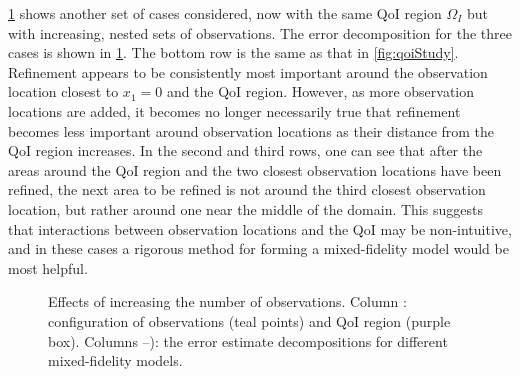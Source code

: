 \cref{fig:dataStudy} shows another set of cases considered, now with the same QoI region $\Omega_I$ but with increasing, nested sets of observations.
The error decomposition for the three cases is shown in \cref{fig:dataStudy}. The bottom row is the same as that in \cref{fig:qoiStudy}. Refinement appears to be consistently most important around the observation location closest to $x_1=0$ and the QoI region. However, as more observation locations are added, it becomes no longer necessarily true that refinement becomes less important around observation locations as their distance from the QoI region increases. In the second and third rows, one can see that after the areas around the QoI region and the two closest observation locations have been refined, the next area to be refined is not around the third closest observation location, but rather around one near the middle of the domain. This suggests that interactions between observation locations and the QoI may be non-intuitive, and in these cases a rigorous method for forming a mixed-fidelity model would be most helpful. %

\begin{figure}[htbp]
\centering
{}
  \caption{Effects of increasing the number of observations. Column \protect{}: configuration of observations (teal points) and QoI region (purple box). Columns \protect{}--\protect{}): the error estimate decompositions for different mixed-fidelity models.}
  \label{fig:dataStudy}
\end{figure}


